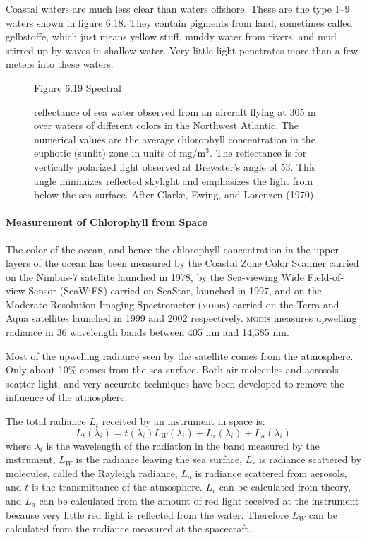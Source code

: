 Coastal waters are much less clear than waters offshore. These are the
type 1--9 waters shown in figure 6.18. They contain pigments from
land, sometimes called gelbstoffe, which just means yellow stuff,
muddy water from rivers, and mud stirred up by waves in shallow
water. Very little light penetrates more than a few meters into these
waters.

\begin{figure}[t!]
\footnotesize
Figure 6.19 Spectral \rule{0mm}{4ex}reflectance of sea water observed
from an aircraft flying at 305 m over waters of different colors in
the Northwest Atlantic. The numerical values are the average
chlorophyll concentration in the euphotic (sunlit) zone in units of
mg/m$^3$. The reflectance is for vertically polarized light observed
at Brewster's angle of 53\degrees. This angle minimizes reflected
skylight and emphasizes the light from below the sea surface. After
Clarke, Ewing, and Lorenzen (1970).
\label{fig:reflectance}
\vspace{-3ex}
\end{figure}

\paragraph{Measurement of Chlorophyll from Space}%
The color of the ocean, and
hence the chlorophyll concentration in the upper layers of the ocean
has been measured by the Coastal Zone Color Scanner carried on the
Nimbus-7 satellite launched in 1978, by the Sea-viewing Wide
Field-of-view Sensor (SeaWiFS) carried on SeaStar, launched in 1997,
and on the Moderate Resolution Imaging Spectrometer
(\textsc{modis}) carried on the Terra and Aqua satellites launched in
1999 and 2002 respectively. \textsc{modis} measures
upwelling radiance in 36 wavelength bands
between 405 nm and 14,385 nm.

Most of the upwelling radiance seen by the satellite comes from the
atmosphere. Only about 10\% comes from the sea surface. Both air
molecules and aerosols scatter light, and very accurate techniques
have been developed to remove the influence of the atmosphere.

The total radiance $L_t$ received by an instrument in space is:
\begin{equation}
L_t(\lambda_i) = t(\lambda_i)L_W(\lambda_i)+L_r(\lambda_i)+L_a(\lambda_i)
\end{equation}
where $\lambda_i$ is the wavelength of the radiation in the band
measured by the instrument, $L_W$ is the radiance leaving the sea
surface, $L_r$ is radiance scattered by molecules, called the Rayleigh
radiance, $L_a$ is radiance scattered from aerosols, and $t$ is the
transmittance of the atmosphere. $L_r$ can be calculated from theory,
and $L_a$ can be calculated from the amount of red light received at
the instrument because very little red light is reflected from the
water. Therefore $L_W$ can be calculated from the radiance measured at
the spacecraft.

